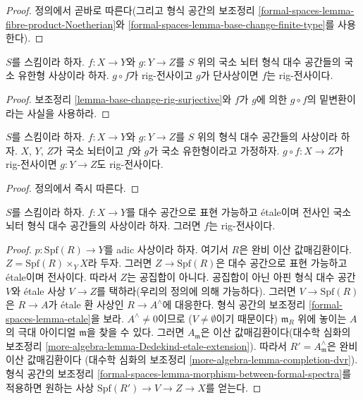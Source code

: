 \begin{proof}
정의에서 곧바로 따른다(그리고 형식 공간의 보조정리
\ref{formal-spaces-lemma-fibre-product-Noetherian}와
\ref{formal-spaces-lemma-base-change-finite-type}를 사용한다).
\end{proof}

\begin{lemma}
\label{lemma-rig-surjective-alternative-permanence}
$S$를 스킴이라 하자. $f : X \to Y$와 $g : Y \to Z$를 $S$ 위의
국소 뇌터 형식 대수 공간들의 국소 유한형 사상이라 하자.
$g \circ f$가 rig-전사이고 $g$가 단사상이면 $f$는 rig-전사이다.
\end{lemma}

\begin{proof}
보조정리 \ref{lemma-base-change-rig-surjective}와 $f$가 $g$에 의한
$g \circ f$의 밑변환이라는 사실을 사용하라.
\end{proof}

\begin{lemma}
\label{lemma-permanence-rig-surjective}
$S$를 스킴이라 하자. $f : X \to Y$와 $g : Y \to Z$를 $S$ 위의
형식 대수 공간들의 사상이라 하자. $X$, $Y$, $Z$가 국소 뇌터이고
$f$와 $g$가 국소 유한형이라고 가정하자. $g \circ f : X \to Z$가
rig-전사이면 $g : Y \to Z$도 rig-전사이다.
\end{lemma}

\begin{proof}
정의에서 즉시 따른다.
\end{proof}

\begin{lemma}
\label{lemma-etale-covering-rig-surjective}
$S$를 스킴이라 하자. $f : X \to Y$를 대수 공간으로 표현 가능하고
\'etale이며 전사인 국소 뇌터 형식 대수 공간들의 사상이라 하자.
그러면 $f$는 rig-전사이다.
\end{lemma}

\begin{proof}
$p : \text{Spf}(R) \to Y$를 adic 사상이라 하자. 여기서 $R$은 완비
이산 값매김환이다. $Z = \text{Spf}(R) \times_Y X$라 두자. 그러면
$Z \to \text{Spf}(R)$은 대수 공간으로 표현 가능하고 \'etale이며
전사이다. 따라서 $Z$는 공집합이 아니다. 공집합이 아닌 아핀 형식 대수 공간
$V$와 \'etale 사상 $V \to Z$를 택하라(우리의 정의에 의해 가능하다).
그러면 $V \to \text{Spf}(R)$은 $R \to A$가 \'etale 환 사상인
$R \to A^\wedge$에 대응한다. 형식 공간의 보조정리
\ref{formal-spaces-lemma-etale}을 보라. $A^\wedge \not = 0$이므로
($V \not = \emptyset$이기 때문이다) $\mathfrak m_R$ 위에 놓이는
$A$의 극대 아이디얼 $\mathfrak m$을 찾을 수 있다. 그러면
$A_\mathfrak m$은 이산 값매김환이다(대수학 심화의 보조정리
\ref{more-algebra-lemma-Dedekind-etale-extension}).
따라서 $R' = A_\mathfrak m^\wedge$은 완비 이산 값매김환이다
(대수학 심화의 보조정리 \ref{more-algebra-lemma-completion-dvr}).
형식 공간의 보조정리
\ref{formal-spaces-lemma-morphism-between-formal-spectra}를 적용하면
원하는 사상 $\text{Spf}(R') \to V \to Z \to X$를 얻는다.
\end{proof}


